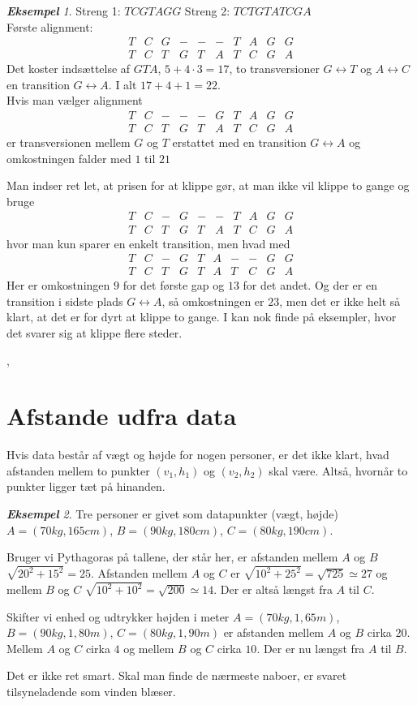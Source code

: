 \documentclass[a4paper, 12pt]{article}
\theoremstyle{remark}
\newtheorem{Eksempel}{\textbf{Eksempel}}
\begin{document}
\begin{Eksempel}
Streng 1: $TCGTAGG$ Streng 2: $TCTGTATCGA$
\\Første alignment:
$$\begin{matrix}T&C&G&-&-&-&T&A&G&G\\T&C&T&G&T&A&T&C&G&A\end{matrix}$$
Det koster indsættelse af $GTA$, $5+4\cdot 3=17$, to  transversioner $G\leftrightarrow T$ og $A\leftrightarrow C$ en transition $G\leftrightarrow A$. I alt $17+4+1=22$.\\
Hvis man vælger alignment 
$$\begin{matrix}T&C&-&-&-&G&T&A&G&G\\T&C&T&G&T&A&T&C&G&A\end{matrix}$$
er transversionen mellem $G$ og $T$ erstattet med en transition $G\leftrightarrow A$ og omkostningen falder med $1$ til $21$

Man indser ret let, at prisen for at klippe gør, at man ikke vil klippe to gange og  bruge 
$$\begin{matrix}T&C&-&G&-&-&T&A&G&G\\T&C&T&G&T&A&T&C&G&A\end{matrix}$$
hvor man kun sparer en enkelt transition, men hvad med 
$$\begin{matrix}T&C&-&G&T&A&-&-&G&G\\T&C&T&G&T&A&T&C&G&A\end{matrix}$$
Her er omkostningen $9$ for det første gap og $13$ for det andet. Og der er en transition i sidste plads $G\leftrightarrow A$, så omkostningen er $23$, men det er ikke helt så klart, at det er for dyrt at klippe to gange. I kan nok finde på eksempler, hvor det svarer sig at klippe flere steder. 
\end{Eksempel}, 



\section*{Afstande udfra data}
Hvis data består af vægt og højde for nogen personer, er det ikke klart, hvad afstanden mellem to punkter $(v_1,h_1)$ og $(v_2,h_2)$ skal være. Altså, hvornår to punkter ligger tæt på hinanden. 
\begin{Eksempel}
Tre personer er givet som datapunkter (vægt, højde) $A=(70 kg, 165 cm)$, $B=(90 kg, 180 cm)$, $C=(80 kg, 190 cm)$.

Bruger vi Pythagoras på tallene, der står her, er afstanden mellem $A$ og $B$ $\sqrt{20^2+15^2}=25$. Afstanden mellem $A$ og $C$ er $\sqrt{10^2+25^2}=\sqrt{725}\simeq 27$ og mellem $B$ og $C$ $\sqrt{10^2+10^2}=\sqrt{200}\simeq 14$. Der er altså længst fra $A$ til $C$.

Skifter vi enhed og udtrykker højden i meter $A=(70 kg, 1,\!65 m)$, $B=(90 kg, 1,\!80 m)$, $C=(80 kg, 1,\!90 m)$ er afstanden mellem $A$ og $B$ cirka 20. Mellem $A$ og $C$ cirka $4$ og mellem $B$ og $C$ cirka $10$. Der er nu længst fra $A$ til $B$.

Det er ikke ret smart. Skal man finde de nærmeste naboer, er svaret tilsyneladende som vinden blæser. 

\end{Eksempel}
\end{document}

